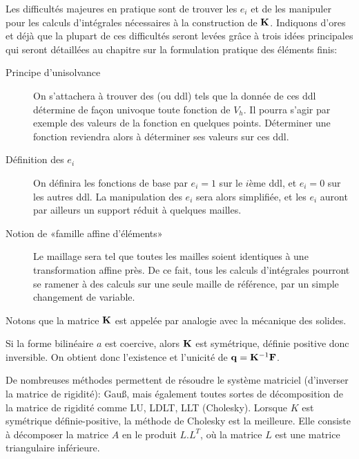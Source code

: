 \medskip
Les difficultés majeures en pratique sont de trouver les $e_i$ et de les manipuler
pour les calculs d'intégrales nécessaires à la construction de $\MM{K}$.
Indiquons d'ores et déjà que la plupart de ces difficultés seront levées
grâce à trois idées principales qui seront détaillées au chapitre sur
la formulation pratique des éléments finis:
\begin{description}
 \item[Principe d'unisolvance]

	On s'attachera à trouver des  (ou
	ddl) tels que la donnée de ces ddl détermine de façon univoque
	toute fonction de $V_h$.
	Il pourra s'agir par exemple des valeurs de la fonction en quelques points.
	Déterminer une fonction reviendra alors à déterminer ses valeurs sur ces ddl.
  \item[Définition des $e_i$]

	On définira les fonctions de base par $e_i = 1$ sur le $i$ème ddl, et
	$e_i = 0$ sur les autres ddl.
	La manipulation des $e_i$ sera alors simplifiée, et les $e_i$
	auront par ailleurs un support réduit à quelques mailles.

	\item[Notion de «famille affine d'éléments»]

	Le maillage sera tel que toutes les mailles soient identiques à une
	transformation affine près.
	De ce fait, tous les calculs d'intégrales pourront se ramener à
	des calculs sur une seule maille de référence, par un simple changement
	de variable.
\end{description}
\medskip
Notons que la matrice $\MM{K}$ est appelée  par
analogie avec la mécanique des solides.

\medskip
Si la forme bilinéaire $a$ est coercive, alors $\MM{K}$ est symétrique, définie positive
donc inversible. On obtient donc l'existence et l'unicité de $\VV{q} = \MMI{K}\VV{F}$.

De nombreuses méthodes permettent de résoudre le système matriciel (d'inverser la
matrice de rigidité): Gauß, mais également 
toutes sortes de décomposition de la matrice de rigidité comme LU, LDLT, LLT (Cholesky).
Lorsque $K$ est symétrique définie-positive, la méthode de Cholesky
est la meilleure. Elle consiste à décomposer la matrice $A$ en le produit $L.L^T$,
où la matrice $L$ est une matrice triangulaire inférieure.


